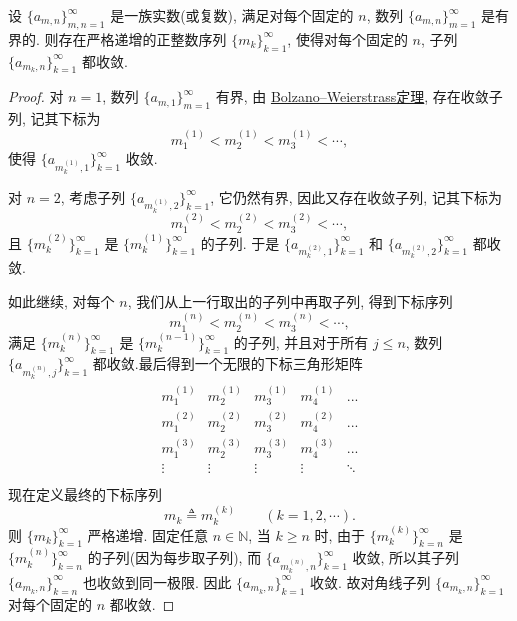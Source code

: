 \documentclass[../../main.tex]{subfiles}%
\begin{document}
\begin{proposition}[对角线法则]\label{proposition:对角线法则}
设 $\{a_{m,n}\}_{m,n=1}^{\infty}$ 是一族实数(或复数), 满足对每个固定的 $n$, 数列 $\{a_{m,n}\}_{m=1}^{\infty}$ 是有界的.
则存在严格递增的正整数序列 $\{m_k\}_{k=1}^{\infty}$, 使得对每个固定的 $n$, 子列 $\{a_{m_k,n}\}_{k=1}^{\infty}$ 都收敛.
\end{proposition}
\begin{proof}
对 $n=1$, 数列 $\{a_{m,1}\}_{m=1}^{\infty}$ 有界, 由 \hyperref[Real Analysis-theorem:R^n中的Bolzano--Weierstrass定理]{Bolzano--Weierstrass定理}, 存在收敛子列, 记其下标为
\[
m_1^{(1)} < m_2^{(1)} < m_3^{(1)} < \cdots,
\]
使得 $\{a_{m_k^{(1)},1}\}_{k=1}^{\infty}$ 收敛.

对 $n=2$, 考虑子列 $\{a_{m_k^{(1)},2}\}_{k=1}^{\infty}$, 它仍然有界, 因此又存在收敛子列, 记其下标为
\[
m_1^{(2)} < m_2^{(2)} < m_3^{(2)} < \cdots,
\]
且 $\{m_k^{(2)}\}_{k=1}^{\infty}$ 是 $\{m_k^{(1)}\}_{k=1}^{\infty}$ 的子列.
于是 $\{a_{m_k^{(2)},1}\}_{k=1}^{\infty}$ 和 $\{a_{m_k^{(2)},2}\}_{k=1}^{\infty}$ 都收敛.

如此继续, 对每个 $n$, 我们从上一行取出的子列中再取子列, 得到下标序列
\[
m_1^{(n)} < m_2^{(n)} < m_3^{(n)} < \cdots,
\]
满足 $\{m_k^{(n)}\}_{k=1}^{\infty}$ 是 $\{m_k^{(n-1)}\}_{k=1}^{\infty}$ 的子列, 并且对于所有 $j\leqslant n$, 数列 $\{a_{m_k^{(n)},j}\}_{k=1}^{\infty}$ 都收敛.最后得到一个无限的下标三角形矩阵
\begin{align*}
\begin{matrix}
m_{1}^{(1)}&		m_{2}^{(1)}&		m_{3}^{(1)}&		m_{4}^{(1)}&		...\\
m_{1}^{(2)}&		m_{2}^{(2)}&		m_{3}^{(2)}&		m_{4}^{(2)}&		...\\
m_{1}^{(3)}&		m_{2}^{(3)}&		m_{3}^{(3)}&		m_{4}^{(3)}&		...\\
\vdots&		\vdots&		\vdots&		\vdots&		\ddots\\
\end{matrix}
\end{align*}
现在定义最终的下标序列
\[
m_k \triangleq m_k^{(k)} \qquad (k=1,2,\cdots).
\]
则 $\{m_k\}_{k=1}^{\infty}$ 严格递增. 固定任意 $n\in \mathbb{N}$, 当 $k\geqslant n$ 时, 由于 $\{m_k^{(k)}\}_{k=n}^{\infty}$ 是 $\{m_k^{(n)}\}_{k=n}^{\infty}$ 的子列(因为每步取子列), 而 $\{a_{m_k^{(n)},n}\}_{k=1}^{\infty}$ 收敛, 所以其子列 $\{a_{m_k,n}\}_{k=n}^{\infty}$ 也收敛到同一极限. 因此 $\{a_{m_k,n}\}_{k=1}^{\infty}$ 收敛.
故对角线子列 $\{a_{m_k,n}\}_{k=1}^{\infty}$ 对每个固定的 $n$ 都收敛.
\end{proof}
\end{document}
